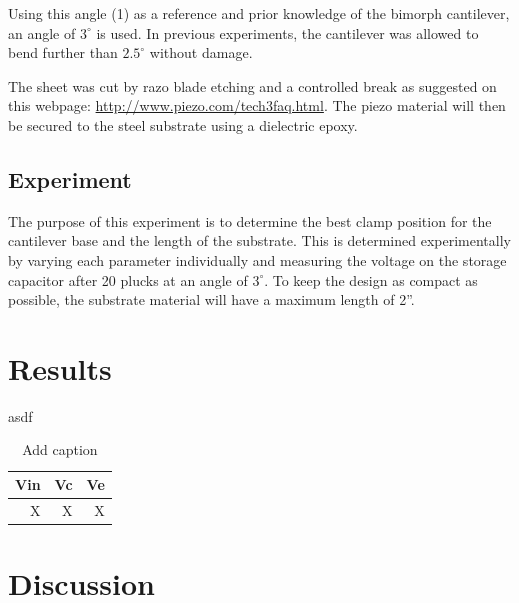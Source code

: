 \documentclass[aps,prl,twocolumn,groupedaddress]{revtex4}
\begin{document}
Using this angle (1) as a reference and prior knowledge of the bimorph cantilever, an angle of $3^\circ$ is used. In previous experiments, the cantilever was allowed to bend further than $2.5^\circ$ without damage. 

The sheet was cut by razo blade etching and a controlled break as suggested on this webpage: \url{http://www.piezo.com/tech3faq.html}. The piezo material will then be secured to the steel substrate using a dielectric epoxy. 

\subsection{Experiment}
  
The purpose of this experiment is to determine the best clamp position for the cantilever base and the length of the substrate. This is determined experimentally by varying each parameter individually and measuring the voltage on the storage capacitor after 20 plucks at an angle of $3^\circ$. To keep the design as compact as possible, the substrate material will have a maximum length of 2''. 

\section{Results}

asdf

\begin{table}[htbp]
  \centering
  \caption{Add caption}
    \begin{tabular}{rrr}
    \toprule
    \textbf{Vin} & \textbf{Vc} & \textbf{Ve} \\
    \midrule
    X     &  X   & X  \\

    \bottomrule
    \end{tabular}%
  \label{tab:addlabel}%
\end{table}%






\section{Discussion}

\vfill
\end{document}
